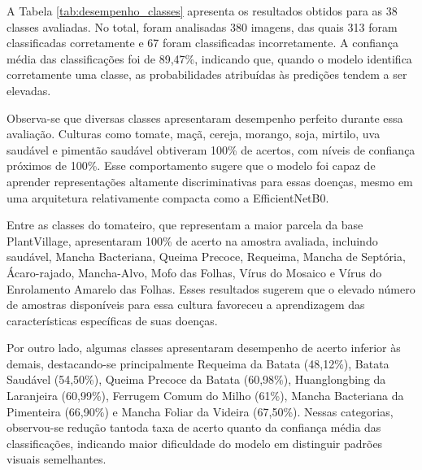 \documentclass[portuguese]{sbc2025}%
\begin{document}
A Tabela \ref{tab:desempenho_classes} apresenta os resultados obtidos para as 38 classes avaliadas. No total, foram analisadas 380
imagens, das quais 313 foram classificadas corretamente e 67 foram classificadas incorretamente. A confiança média das classificações
foi de 89,47\%, indicando que, quando o modelo identifica corretamente uma classe, as probabilidades atribuídas às predições tendem 
a ser elevadas.

Observa-se que diversas classes apresentaram desempenho perfeito durante essa avaliação. Culturas como tomate, maçã, cereja, morango, 
soja, mirtilo, uva saudável e pimentão saudável obtiveram 100\% de acertos, com níveis de confiança próximos de 100\%. Esse comportamento
sugere que o modelo foi capaz de aprender representações altamente discriminativas para essas doenças, mesmo em uma arquitetura 
relativamente compacta como a EfficientNetB0.

Entre as classes do tomateiro, que representam a maior parcela da base PlantVillage, apresentaram 100\% de acerto na amostra avaliada, 
incluindo saudável, Mancha Bacteriana, Queima Precoce, Requeima, Mancha de Septória, Ácaro-rajado, Mancha-Alvo, Mofo das Folhas, 
Vírus do Mosaico e Vírus do Enrolamento Amarelo das Folhas. Esses resultados sugerem que o elevado número de amostras disponíveis para
essa cultura favoreceu a aprendizagem das características específicas de suas doenças.

Por outro lado, algumas classes apresentaram desempenho de acerto inferior às demais, destacando-se principalmente Requeima da Batata
(48,12\%), Batata Saudável (54,50\%), Queima Precoce da Batata (60,98\%), Huanglongbing da Laranjeira (60,99\%), Ferrugem Comum
do Milho (61\%), Mancha Bacteriana da Pimenteira (66,90\%) e Mancha Foliar da Videira (67,50\%). Nessas categorias, observou-se redução 
tantoda taxa de acerto quanto da confiança média das classificações, indicando maior dificuldade do modelo em distinguir padrões 
visuais semelhantes.
\end{document}
